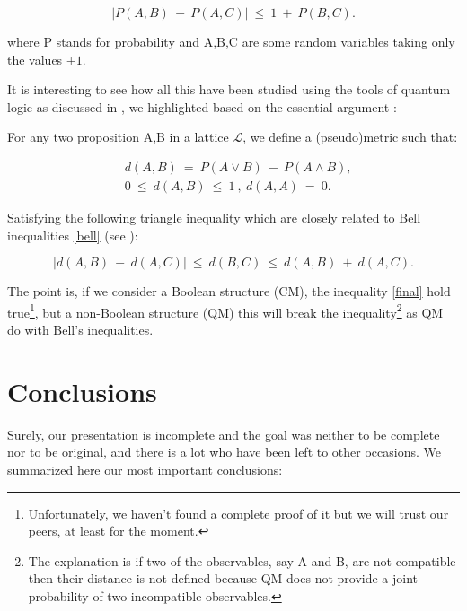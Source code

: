 \documentclass[12pt]{article}
\begin{document}
\begin{equation}
|P(A,B)~-~P(A,C)|~\leq~1~+~P(B,C).\label{bell}
\end{equation}  

where P stands for probability and A,B,C are some random variables taking only the values $\pm 1$.

It is interesting to see how all this have been studied using the tools of quantum logic as discussed in \cite{bell1,bell2,bell3}, we highlighted based on \cite{bell2} the essential argument :   


For any two proposition A,B in a lattice $\mathcal{L}$, we define a (pseudo)metric such that: 

\begin{equation}\begin{aligned}
&d(A,B)~=~P(A \lor B)~-~P(A \land B),\\ 
&0~\leq~d(A,B)~\leq~1~,~d(A,A)~=~0.\label{metric}
\end{aligned}\end{equation}

Satisfying the following triangle inequality which are closely related to Bell inequalities \eqref{bell} (see \cite{santos}): 

\begin{equation}
|d(A,B)~-~d(A,C)|~\leq~d(B,C)~\leq~d(A,B)~+~d(A,C).\label{final}
\end{equation}

The point is, if we consider a Boolean structure (CM), the inequality \eqref{final} hold true\footnote{Unfortunately, we haven't found a complete proof of it but we will trust our peers, at least for the moment.}, but a non-Boolean structure (QM) this will break the inequality\footnote{The explanation is if two of the observables, say A and B, are not compatible then their distance is not defined because QM does not provide a joint probability of two incompatible observables.} as QM do with Bell's inequalities.  

\vspace{-0.4cm}
\section{Conclusions}
\vspace{-0.2cm}

Surely, our presentation is incomplete and the goal was neither to be complete nor to be original, and there is a lot who have been left to other occasions. We summarized here our most important conclusions:
 
\end{document}
